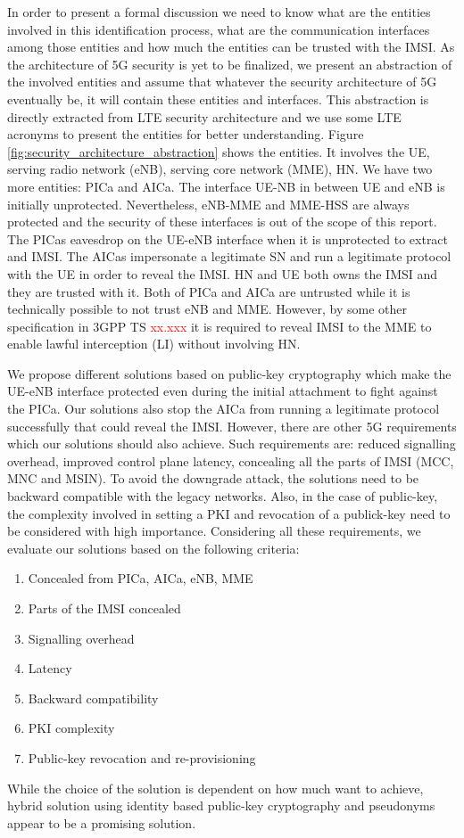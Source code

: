 \documentclass[lnicst,sechang,a4paper]{svmultln}
\begin{document}
In order to present a formal discussion we need to know what are the entities involved in this identification process, what are the communication interfaces among those entities and how much the entities can be trusted with the IMSI.  As the architecture of 5G security is yet to be finalized, we present an abstraction of the involved entities and assume that whatever the security architecture of 5G eventually be, it will contain these entities and interfaces. This abstraction is directly extracted from LTE security architecture and we use some LTE acronyms to present the entities for better understanding. Figure \ref{fig:security_architecture_abstraction} shows the entities. It involves the UE, serving radio network (eNB), serving core network (MME), HN. We have two more entities: PICa and AICa. The interface  UE-NB in between UE and eNB is initially unprotected. Nevertheless, eNB-MME and MME-HSS are always protected and the security of these interfaces is out of the scope of this report. The PICas eavesdrop on the UE-eNB interface when it is unprotected to extract and IMSI. The AICas impersonate a legitimate SN and run a legitimate protocol with the UE in order to reveal the IMSI. HN and UE both owns the IMSI and they are trusted with it. Both of PICa and AICa are untrusted while it is technically possible to not trust eNB and MME. However, by some other specification in 3GPP TS \textcolor{red}{xx.xxx} it is required to reveal IMSI to the MME to enable lawful interception (LI) without involving HN. 

We propose different solutions based on public-key cryptography which make the UE-eNB interface protected even during the initial attachment to fight against the PICa. Our solutions also stop the AICa from running a legitimate protocol successfully that could reveal the IMSI. However, there are other 5G requirements which our solutions should also achieve. Such requirements are: reduced signalling overhead, improved control plane latency, concealing all the parts of IMSI (MCC, MNC and MSIN). To avoid the downgrade attack, the solutions need to be backward compatible with the legacy networks. Also, in the case of public-key, the complexity involved in setting a PKI and revocation of a publick-key need to be considered with high importance. Considering all these requirements, we evaluate our solutions based on the following criteria:
\begin{enumerate}
\item Concealed from PICa, AICa, eNB, MME
\item Parts of the IMSI concealed
\item Signalling overhead
\item Latency
\item Backward compatibility
\item PKI complexity
\item Public-key revocation and re-provisioning 
\end{enumerate}
While the choice of the solution is dependent on how much want to achieve, hybrid solution using identity based public-key cryptography and pseudonyms appear to be a promising solution.
\end{document}
